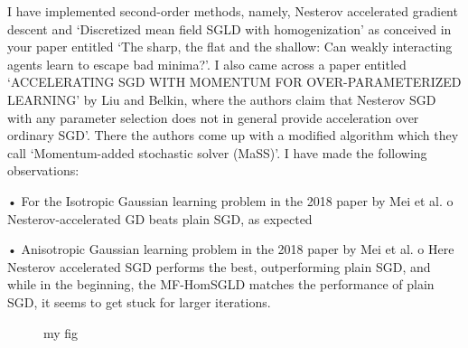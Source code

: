 \documentclass{article}
\begin{document}
I have implemented second-order methods, namely, Nesterov accelerated gradient descent and ‘Discretized mean field SGLD with homogenization’ as conceived in your paper entitled ‘The sharp, the flat and the shallow: Can weakly interacting agents learn to escape bad minima?’. I also came across a paper entitled ‘ACCELERATING SGD WITH MOMENTUM FOR OVER-PARAMETERIZED LEARNING’ by Liu and Belkin, where the authors claim that Nesterov SGD with any parameter selection does not in general provide acceleration over ordinary SGD’. There the authors come up with a modified algorithm which they call ‘Momentum-added stochastic solver (MaSS)’. I have made the following observations:
 
•	For the Isotropic Gaussian learning problem in the 2018 paper by Mei et al.
o	Nesterov-accelerated GD beats plain SGD, as expected
 
 
•	Anisotropic Gaussian learning problem in the 2018 paper by Mei et al.
o	Here Nesterov accelerated SGD performs the best, outperforming plain SGD, and while in the beginning, the MF-HomSGLD matches the performance of plain SGD, it seems to get stuck for larger iterations. 
 


\begin{figure}\centering
{}\hfill
{}\par 
{}
\caption{my fig}
\label{fig}
\end{figure}
\end{document}

